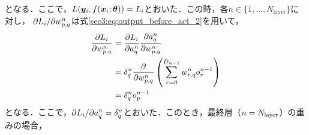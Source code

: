 \documentclass[12pt]{jarticle}
\numberwithin{equation}{section}    %
\numberwithin{figure}{section}      %
\numberwithin{table}{section}      %
\begin{document}
となる．ここで，$L(\bm{y}_{i}, f(\bm{x}_{i}; \bm{\theta})) = L_{i}$とおいた．この時，各$n \in \{1, \ldots, N_{\text{layer}}\}$に対し，
$\partial L_{i} / \partial w_{p, q}^{n}$は式\eqref{sec3:eq:output_before_act_2}を用いて，
\begin{align}
    \frac{\partial L_{i}}{\partial w_{p, q}^{n}} & = \frac{\partial L_{i}}{\partial a_{q}^{n}} \frac{\partial a_{q}^{n}}{\partial w_{p, q}^{n}}      \\
                                                                        & = \delta_{q}^{n} \frac{\partial}{\partial w_{p, q}^{n}} \left(\sum_{r = 0}^{D_{n - 1}} w_{r, q}^{n} o_{r}^{n - 1}\right) \\
                                                                        & = \delta_{q}^{n} o_{p}^{n - 1}
\end{align}
となる．ここで，$\partial L_{i} / \partial a_{q}^{n} = \delta_{q}^{n}$とおいた．このとき，最終層（$n = N_{\text{layer}}$）の重みの場合，
\end{document}

